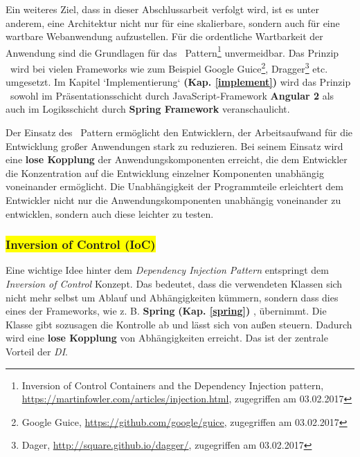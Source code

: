 Ein weiteres Ziel, dass in dieser Abschlussarbeit verfolgt wird, ist es unter anderem, eine Architektur nicht nur für eine skalierbare, sondern auch für eine wartbare Webanwendung aufzustellen. Für die ordentliche Wartbarkeit der Anwendung sind die Grundlagen für das \di\ Pattern\footnote{Inversion of Control Containers and the Dependency Injection pattern, \url{https://martinfowler.com/articles/injection.html}, zugegriffen am 03.02.2017} unvermeidbar. Das Prinzip \di\ wird bei vielen Frameworks wie zum Beispiel Google Guice\footnote{Google Guice, \url{https://github.com/google/guice}, zugegriffen am 03.02.2017}, Dragger\footnote{Dager, \url{http://square.github.io/dagger/}, zugegriffen am 03.02.2017} etc. umgesetzt. Im Kapitel `Implementierung` \textbf{(Kap. \ref{implement})} wird das Prinzip \di\ sowohl im Präsentationsschicht durch JavaScript-Framework \textbf{Angular 2} als auch im Logiksschicht durch \textbf{Spring Framework} veranschaulicht.

Der Einsatz des \di\ Pattern ermöglicht den Entwicklern, der Arbeitsaufwand für die Entwicklung großer Anwendungen stark zu reduzieren. Bei seinem Einsatz wird eine \textbf{lose Kopplung} der Anwendungskomponenten erreicht, die dem Entwickler die Konzentration auf die Entwicklung einzelner Komponenten unabhängig voneinander ermöglicht. Die Unabhängigkeit der Programmteile erleichtert dem Entwickler nicht nur die Anwendungskomponenten unabhängig voneinander zu entwicklen, sondern auch diese leichter zu testen. 

\subsubsection{\colorbox{yellow}{Inversion of Control (IoC)}}

Eine wichtige Idee hinter dem \textit{Dependency Injection Pattern} entspringt dem \textit{Inversion of Control} Konzept. Das bedeutet, dass die verwendeten Klassen sich nicht mehr selbst um Ablauf und Abhängigkeiten kümmern, sondern dass dies eines der Frameworks, wie z. B. \textbf{Spring} \textbf{(Kap. \ref{spring})} , übernimmt. Die Klasse gibt sozusagen die Kontrolle ab und lässt sich von außen steuern. Dadurch wird eine \textbf{lose Kopplung} von Abhängigkeiten erreicht. Das ist der zentrale Vorteil der \textit{DI}.

